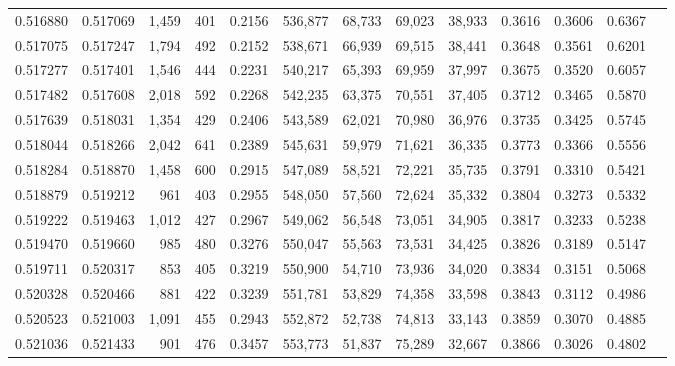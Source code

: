 \begin{tabular}{rrrrrrrrrrrrr}
0.516880 & 0.517069 &  1,459 &   401 &                                     0.2156 & 536,877 &  68,733 &  69,023 &  38,933 & 0.3616 & 0.3606 & 0.6367 \\
0.517075 & 0.517247 &  1,794 &   492 &                                     0.2152 & 538,671 &  66,939 &  69,515 &  38,441 & 0.3648 & 0.3561 & 0.6201 \\
0.517277 & 0.517401 &  1,546 &   444 &                                     0.2231 & 540,217 &  65,393 &  69,959 &  37,997 & 0.3675 & 0.3520 & 0.6057 \\
0.517482 & 0.517608 &  2,018 &   592 &                                     0.2268 & 542,235 &  63,375 &  70,551 &  37,405 & 0.3712 & 0.3465 & 0.5870 \\
0.517639 & 0.518031 &  1,354 &   429 &                                     0.2406 & 543,589 &  62,021 &  70,980 &  36,976 & 0.3735 & 0.3425 & 0.5745 \\
0.518044 & 0.518266 &  2,042 &   641 &                                     0.2389 & 545,631 &  59,979 &  71,621 &  36,335 & 0.3773 & 0.3366 & 0.5556 \\
0.518284 & 0.518870 &  1,458 &   600 &                                     0.2915 & 547,089 &  58,521 &  72,221 &  35,735 & 0.3791 & 0.3310 & 0.5421 \\
0.518879 & 0.519212 &    961 &   403 &                                     0.2955 & 548,050 &  57,560 &  72,624 &  35,332 & 0.3804 & 0.3273 & 0.5332 \\
0.519222 & 0.519463 &  1,012 &   427 &                                     0.2967 & 549,062 &  56,548 &  73,051 &  34,905 & 0.3817 & 0.3233 & 0.5238 \\
0.519470 & 0.519660 &    985 &   480 &                                     0.3276 & 550,047 &  55,563 &  73,531 &  34,425 & 0.3826 & 0.3189 & 0.5147 \\
0.519711 & 0.520317 &    853 &   405 &                                     0.3219 & 550,900 &  54,710 &  73,936 &  34,020 & 0.3834 & 0.3151 & 0.5068 \\
0.520328 & 0.520466 &    881 &   422 &                                     0.3239 & 551,781 &  53,829 &  74,358 &  33,598 & 0.3843 & 0.3112 & 0.4986 \\
0.520523 & 0.521003 &  1,091 &   455 &                                     0.2943 & 552,872 &  52,738 &  74,813 &  33,143 & 0.3859 & 0.3070 & 0.4885 \\
0.521036 & 0.521433 &    901 &   476 &                                     0.3457 & 553,773 &  51,837 &  75,289 &  32,667 & 0.3866 & 0.3026 & 0.4802 \\

\end{tabular}
